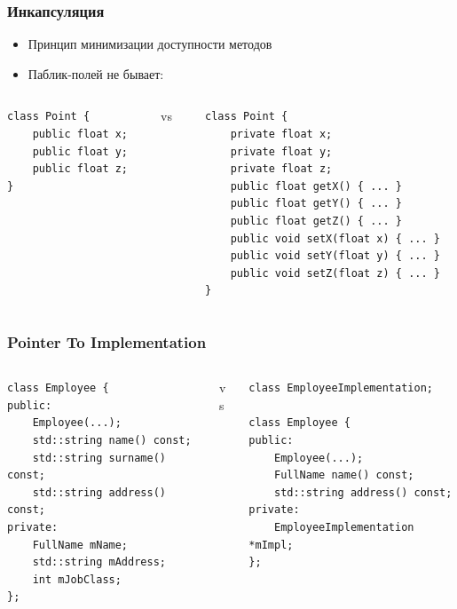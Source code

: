 \documentclass[xetex,mathserif,serif]{beamer}
\begin{document}
	\begin{frame}[fragile]
		\frametitle{Инкапсуляция}
		\begin{itemize}
			\item Принцип минимизации доступности методов
			\item Паблик-полей не бывает:
		\end{itemize}
		\begin{columns}
			\begin{column}{0.25\textwidth}
				\begin{verbatim}
class Point {
    public float x;
    public float y;
    public float z;
}
				\end{verbatim}
			\end{column}
			\begin{column}{0.1\textwidth}
				vs
			\end{column}
			\begin{column}{0.5\textwidth}
				\begin{verbatim}
class Point {
    private float x;
    private float y;
    private float z;
    public float getX() { ... }
    public float getY() { ... }
    public float getZ() { ... }
    public void setX(float x) { ... }
    public void setY(float y) { ... }
    public void setZ(float z) { ... }
}
				\end{verbatim}
			\end{column}
		\end{columns}
\end{frame}

\begin{frame}[fragile]
	\frametitle{Pointer To Implementation}
	\begin{columns}
		\begin{column}{0.32\textwidth}
			\begin{footnotesize}
				\begin{verbatim}
class Employee {
public:
    Employee(...);
    std::string name() const;
    std::string surname() const;
    std::string address() const;
private:
    FullName mName;
    std::string mAddress;
    int mJobClass;
};
				\end{verbatim}
			\end{footnotesize}
		\end{column}
		\begin{column}{0.02\textwidth}
			vs
		\end{column}
		\begin{column}{0.45\textwidth}
			\begin{footnotesize}
				\begin{verbatim}
class EmployeeImplementation;

class Employee {
public:
    Employee(...);
    FullName name() const;
    std::string address() const;
private:
    EmployeeImplementation *mImpl;
};
					\end{verbatim}
				\end{footnotesize}
			\end{column}
		\end{columns}
	\end{frame}
\end{document}
